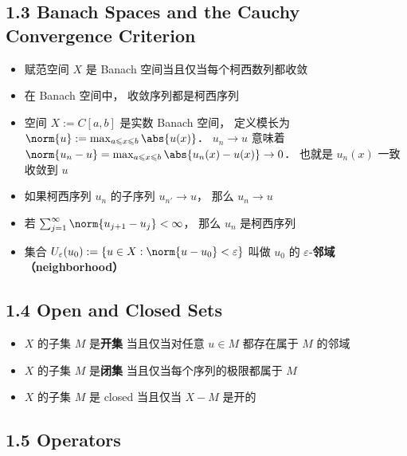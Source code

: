 \subsection{1.3 Banach Spaces and the Cauchy Convergence Criterion}
\begin{itemize}
\item 赋范空间 $X$ 是 Banach 空间当且仅当每个柯西数列都收敛

\item 在 Banach 空间中， 收敛序列都是柯西序列

\item 空间 $X := C[a, b]$ 是实数 Banach 空间， 定义模长为 $\norm{u} := \max_{a \leqslant x \leqslant b} \abs{u(x)}$． $u_n \to u$ 意味着 $\norm{u_n - u} = \max_{a \leqslant x \leqslant b}  \abs{u_n(x) - u(x)} \to 0$． 也就是 $u_n(x)$ 一致收敛到 $u$

\item 如果柯西序列 $u_n$ 的子序列 $u_{n'} \to u$， 那么 $u_n \to u$

\item 若 $\sum_{j=1}^\infty \norm{u_{j+1} - u_j} < \infty$， 那么 $u_n$ 是柯西序列

\item 集合 $U_\varepsilon (u_0) := \{u \in X: \norm{u - u_0} < \varepsilon\}$ 叫做 $u_0$ 的 $\varepsilon$-\textbf{邻域 （neighborhood）}
\end{itemize}

\subsection{1.4 Open and Closed Sets}
\begin{itemize}
\item $X$ 的子集 $M$ 是\textbf{开集} 当且仅当对任意 $u \in M$ 都存在属于 $M$ 的邻域

\item $X$ 的子集 $M$ 是\textbf{闭集} 当且仅当每个序列的极限都属于 $M$

\item $X$ 的子集 $M$ 是 closed 当且仅当 $X - M$ 是开的
\end{itemize}

\subsection{1.5 Operators}

